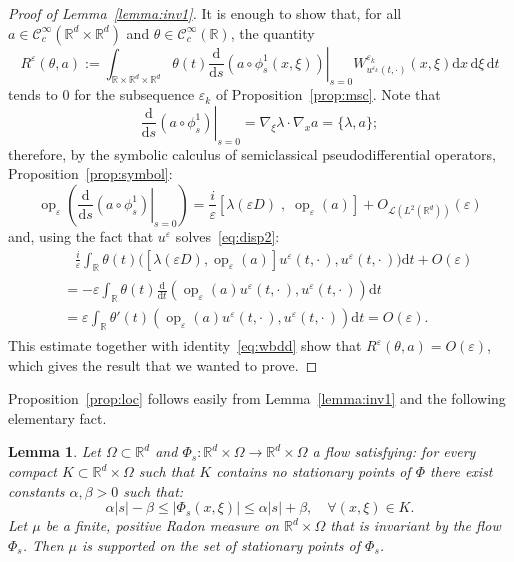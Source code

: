 \documentclass[10pt]{amsart}
\newtheorem{lemm}[cdrthm]{Lemma}
\theoremstyle{definition}
\DeclareMathOperator{\op}{op}
\newcommand*\R{{\mathbb R}}
\newcommand*\eps{\varepsilon}
\newcommand{\To}{\longrightarrow}
\numberwithin{equation}{section}
\let\oldforall\forall
\renewcommand*{\forall}{\mathrel{\oldforall}}
\newcommand*{\dd}{\mathrm{d}}
\newcommand*{\dt}{\dd t}
\newcommand*{\ds}{\dd s}
\newcommand*{\dx}{\dd x}
\newcommand*{\dxi}{\dd \xi}
\begin{document}
\begin{proof}[Proof of Lemma~\ref{lemma:inv1}]
It is enough to show that, for all $a\in{\mathcal C}_c^\infty(\R^d\times\R^d)$ and $\theta\in{\mathcal C}_c^\infty(\R)$, the quantity
\[
R^\eps(\theta,a):=\int_{\R\times\R^d\times\R^d} \theta(t) \left.\frac{\dd}{\ds}(a\circ\phi^1_s(x,\xi))\right|_{s=0}W_{u^{\eps_k}(t,\cdot)}^{\eps_k}(x,\xi)\dx\,\dxi\, \dt
\]
tends to $0$ for the subsequence $\eps_k$ of Proposition~\ref{prop:msc}.
Note that
\[
\left.\frac{\dd}{\ds}(a\circ\phi^1_s)\right|_{s=0}=\nabla_\xi\lambda\cdot\nabla_x a=\{\lambda,a\};
\]
therefore, by the symbolic calculus of semiclassical pseudodifferential operators, Proposition~\ref{prop:symbol}:
\[
\op_\eps\left(\left.\frac{\dd}{\ds}(a\circ\phi^1_s)\right|_{s=0}\right) = \frac{i}{\eps} \left[\lambda(\eps D)\;,\;\op_\eps(a)\right]+O_{{\mathcal L}\left(L^2(\R^d)\right)}(\eps)
\]
and, using the fact that $u^\eps$ solves~\eqref{eq:disp2}:
\begin{multline*}
\qquad \frac{i}{\eps}\int_\R\theta(t) \big(\left[\lambda(\eps D),\op_\eps(a)\right] u^\eps(t,\cdot\,),u^\eps(t,\cdot\,)\big) \dt+O(\eps)
\\
\begin{aligned}
&= -\eps \int_\R \theta(t) \frac{\dd}{\dt} \left(\op_\eps(a) u^\eps(t,\cdot\,),u^\eps(t,\cdot\,)\right) \dt\\
&= \eps \int_\R \theta'(t)\left(\op_\eps(a) u^\eps(t,\cdot\,),u^\eps(t,\cdot\,)\right) \dt
= O(\eps).
\end{aligned}
\end{multline*}
This estimate together with identity~\eqref{eq:wbdd} show that $R^\eps(\theta,a)=O(\eps)$, which gives the result that we wanted to prove.
\end{proof}

Proposition~\ref{prop:loc} follows easily from Lemma~\ref{lemma:inv1} and the following elementary fact.

\begin{lemm}\label{lem:classicdisp}
Let $\Omega\subset\R^d$ and $\Phi_s:\R^d\times\Omega\To\R^d\times\Omega$ a flow satisfying: for every compact $K\subset\R^d\times\Omega$ such that $K$ contains no stationary points of $\Phi$ there exist constants $\alpha,\beta>0$ such that:
\[
\alpha |s| - \beta \leqslant |\Phi_s(x,\xi)| \leqslant \alpha|s|+\beta,\quad\forall(x,\xi)\in K.
\]
Let $\mu$ be a finite, positive Radon measure on $\R^d\times\Omega$ that is invariant by the flow $\Phi_s$. Then $\mu$ is supported on the set of stationary points of $\Phi_s$.
\end{lemm}
\end{document}
